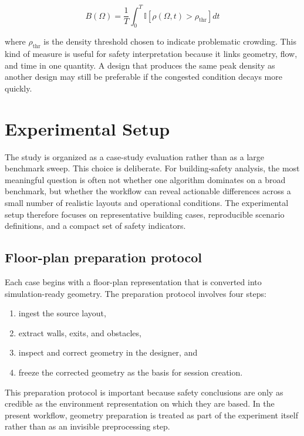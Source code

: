 \documentclass[conference]{IEEEtran}
\begin{document}
\begin{equation}
B(\Omega) = \frac{1}{T} \int_{0}^{T} \mathbb{I}\!\left[\rho(\Omega,t) > \rho_{\text{thr}}\right] dt
\label{eq:bottleneck}
\end{equation}

where $\rho_{\text{thr}}$ is the density threshold chosen to indicate problematic crowding. This kind of measure is useful for safety interpretation because it links geometry, flow, and time in one quantity. A design that produces the same peak density as another design may still be preferable if the congested condition decays more quickly.

\section{Experimental Setup}

The study is organized as a case-study evaluation rather than as a large benchmark sweep. This choice is deliberate. For building-safety analysis, the most meaningful question is often not whether one algorithm dominates on a broad benchmark, but whether the workflow can reveal actionable differences across a small number of realistic layouts and operational conditions. The experimental setup therefore focuses on representative building cases, reproducible scenario definitions, and a compact set of safety indicators.

\subsection{Floor-plan preparation protocol}

Each case begins with a floor-plan representation that is converted into simulation-ready geometry. The preparation protocol involves four steps:
\begin{enumerate}
    \item ingest the source layout,
    \item extract walls, exits, and obstacles,
    \item inspect and correct geometry in the designer, and
    \item freeze the corrected geometry as the basis for session creation.
\end{enumerate}

This preparation protocol is important because safety conclusions are only as credible as the environment representation on which they are based. In the present workflow, geometry preparation is treated as part of the experiment itself rather than as an invisible preprocessing step.
\end{document}
